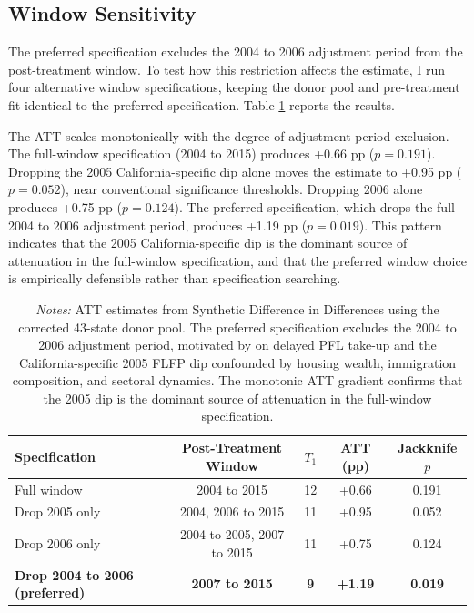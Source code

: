 \documentclass[12pt, letterpaper]{article}
\begin{document}
\subsection{Window Sensitivity}

The preferred specification excludes the 2004 to 2006 adjustment period from the post-treatment window. To test how this restriction affects the estimate, I run four alternative window specifications, keeping the donor pool and pre-treatment fit identical to the preferred specification. Table \ref{tab:window_sensitivity} reports the results.

The ATT scales monotonically with the degree of adjustment period exclusion. The full-window specification (2004 to 2015) produces +0.66 pp ($p = 0.191$). Dropping the 2005 California-specific dip alone moves the estimate to +0.95 pp ($p = 0.052$), near conventional significance thresholds. Dropping 2006 alone produces +0.75 pp ($p = 0.124$). The preferred specification, which drops the full 2004 to 2006 adjustment period, produces +1.19 pp ($p = 0.019$). This pattern indicates that the 2005 California-specific dip is the dominant source of attenuation in the full-window specification, and that the preferred window choice is empirically defensible rather than specification searching.

\begin{table}[H]
\centering
\caption{Sensitivity to Adjustment Period Exclusion}
\label{tab:window_sensitivity}
\begin{tabular}{lcccc}
\toprule
\textbf{Specification} & \textbf{Post-Treatment Window} & \textbf{$T_1$} & \textbf{ATT (pp)} & \textbf{Jackknife $p$} \\
\midrule
Full window & 2004 to 2015 & 12 & +0.66 & 0.191 \\
Drop 2005 only & 2004, 2006 to 2015 & 11 & +0.95 & 0.052 \\
Drop 2006 only & 2004 to 2005, 2007 to 2015 & 11 & +0.75 & 0.124 \\
\textbf{Drop 2004 to 2006 (preferred)} & \textbf{2007 to 2015} & \textbf{9} & \textbf{+1.19} & \textbf{0.019} \\
\bottomrule
\end{tabular}
\caption*{\footnotesize \textit{Notes:} ATT estimates from Synthetic Difference in Differences using the corrected 43-state donor pool. The preferred specification excludes the 2004 to 2006 adjustment period, motivated by \citet{bailey2019} on delayed PFL take-up and the California-specific 2005 FLFP dip confounded by housing wealth, immigration composition, and sectoral dynamics. The monotonic ATT gradient confirms that the 2005 dip is the dominant source of attenuation in the full-window specification.}
\end{table}
\end{document}
